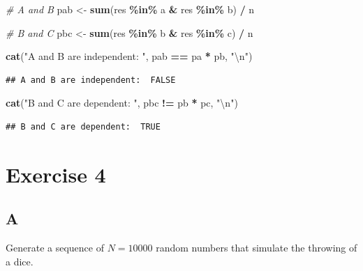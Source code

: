 \documentclass[
]{article}
\newenvironment{Shaded}{\begin{snugshade}}{\end{snugshade}}
\newcommand{\CharTok}[1]{\textcolor[rgb]{0.31,0.60,0.02}{#1}}
\newcommand{\CommentTok}[1]{\textcolor[rgb]{0.56,0.35,0.01}{\textit{#1}}}
\newcommand{\KeywordTok}[1]{\textcolor[rgb]{0.13,0.29,0.53}{\textbf{#1}}}
\newcommand{\NormalTok}[1]{#1}
\newcommand{\OperatorTok}[1]{\textcolor[rgb]{0.81,0.36,0.00}{\textbf{#1}}}
\newcommand{\StringTok}[1]{\textcolor[rgb]{0.31,0.60,0.02}{#1}}
\begin{document}
\begin{Shaded}
\begin{Highlighting}[]
\CommentTok{\# A and B}
\NormalTok{pab \textless{}{-}}\StringTok{ }\KeywordTok{sum}\NormalTok{(res }\OperatorTok{\%in\%}\StringTok{ }\NormalTok{a }\OperatorTok{\&}\StringTok{ }\NormalTok{res }\OperatorTok{\%in\%}\StringTok{ }\NormalTok{b) }\OperatorTok{/}\StringTok{ }\NormalTok{n}

\CommentTok{\# B and C}
\NormalTok{pbc \textless{}{-}}\StringTok{ }\KeywordTok{sum}\NormalTok{(res }\OperatorTok{\%in\%}\StringTok{ }\NormalTok{b }\OperatorTok{\&}\StringTok{ }\NormalTok{res }\OperatorTok{\%in\%}\StringTok{ }\NormalTok{c) }\OperatorTok{/}\StringTok{ }\NormalTok{n}

\KeywordTok{cat}\NormalTok{(}\StringTok{"A and B are independent: "}\NormalTok{, pab }\OperatorTok{==}\StringTok{ }\NormalTok{pa }\OperatorTok{*}\StringTok{ }\NormalTok{pb, }\StringTok{"}\CharTok{\textbackslash{}n}\StringTok{"}\NormalTok{)}
\end{Highlighting}
\end{Shaded}

\begin{verbatim}
## A and B are independent:  FALSE
\end{verbatim}

\begin{Shaded}
\begin{Highlighting}[]
\KeywordTok{cat}\NormalTok{(}\StringTok{"B and C are dependent: "}\NormalTok{, pbc }\OperatorTok{!=}\StringTok{ }\NormalTok{pb }\OperatorTok{*}\StringTok{ }\NormalTok{pc, }\StringTok{"}\CharTok{\textbackslash{}n}\StringTok{"}\NormalTok{)}
\end{Highlighting}
\end{Shaded}

\begin{verbatim}
## B and C are dependent:  TRUE
\end{verbatim}

\hypertarget{exercise-4}{%
\section{Exercise 4}\label{exercise-4}}

\hypertarget{a-3}{%
\subsection{A}\label{a-3}}

Generate a sequence of \(N=10000\) random numbers that simulate the
throwing of a dice.
\end{document}
